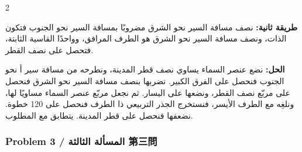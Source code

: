 \documentclass[11pt,a4paper]{article}
\newcommand{\ar}[1]{\arabicfont\beginR #1\endR}
\newcommand{\WorkingsAr}{\par\noindent\textbf{\color{problemcolor}\ar{الحل:}} }
\begin{document}
\begin{paracol}{2}
\vspace{0.2cm}

\ar{\textbf{طريقة ثانية:} نصف مسافة السير نحو الشرق مضروبًا بمسافة السير نحو الجنوب فتكون الذات، ونصف مسافة السير نحو الشرق هو الطرف المرافق، وواحدًا القاسية الثابتة، فتحصل على نصف القطر.}

\vspace{0.2cm}

\WorkingsAr{نضع عنصر السماء يساوي نصف قطر المدينة، ونطرحه من مسافة سير أ نحو الجنوب فنحصل على الفرق الكبير. نضربها بنصف مسافة السير نحو الشرق فنحصل على مربّع نصف القطر، ونضعها على اليسار. ثم نجعل مربّع عنصر السماء مساويًا لها، ونلغِه مع الطرف الأيسر، فنستخرج الجذر التربيعي ذا الطرف فنحصل على 120 خطوة. نضعفها فنحصل على قطر المدينة. يتطابق مع المطلوب.}

\end{paracol}

\vspace{0.5cm}

\subsubsection*{Problem 3 / \ar{المسألة الثالثة} \quad 第三問}
\end{document}
